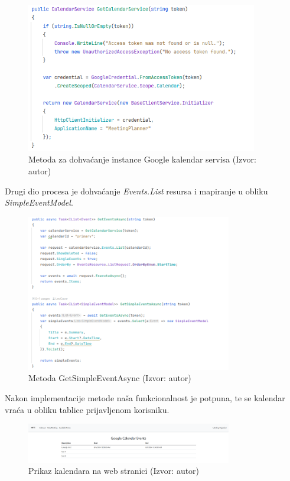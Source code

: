 \documentclass{foi}
\begin{document}
\begin{figure}[H]
    \centering
    \includegraphics[width=0.9\textwidth]{slike/GetCalendarService.png}
    \caption{Metoda za dohvaćanje instance Google kalendar servisa (Izvor: autor)}
    \label{fig:GetCalendarService}

\end{figure}
Drugi dio procesa je dohvaćanje \textit{Events.List} resursa i mapiranje u obliku \textit{SimpleEventModel}.
\begin{figure}[H]
    \centering
    \includegraphics[width=0.8\textwidth]{slike/GetSimpleEventAsync.png}
    \caption{Metoda GetSimpleEventAsync (Izvor: autor)}
    \label{fig:GetSimpleEventAsync}
\end{figure}
Nakon implementacije metode naša funkcionalnost je potpuna, te se kalendar vraća u obliku tablice prijavljenom korisniku.
\begin{figure}[H]
    \centering
    \includegraphics[width=0.8\textwidth]{slike/calendarEvents.png}
    \caption{Prikaz kalendara na web stranici (Izvor: autor)}
    \label{fig:CalendarViewImg}
\end{figure}
\end{document}
